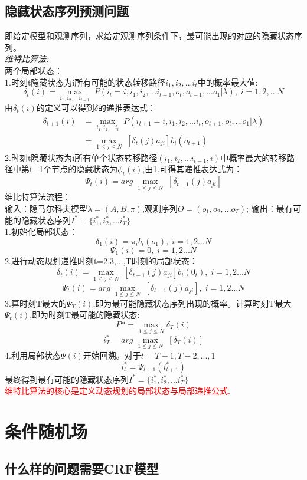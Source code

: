 \documentclass[UTF8]{article}%
\begin{document}
	\subsection{隐藏状态序列预测问题}
	即给定模型和观测序列，求给定观测序列条件下，最可能出现的对应的隐藏状态序列。\\
	\emph{\large 维特比算法:}\\
	两个局部状态：\\
	1.时刻t隐藏状态为i所有可能的状态转移路径$i_1,i_2,...i_t$中的概率最大值:
	$$\delta_t(i) = \max_{i_1,i_2,...i_{t-1}}\;P(i_t=i, i_1,i_2,...i_{t-1},o_t,o_{t-1},...o_1|\lambda),\; i =1,2,...N$$
	由$\delta_t(i)$的定义可以得到$\delta$的递推表达式：
	\begin{align} 
		 \delta_{t+1}(i)
		  & =  \max_{i_1,i_2,...i_{t}} \; P(i_{t+1}=i,i_1,i_2,...i_{t},o_{t+1},o_{t},...o_1|\lambda)
		  \\ & = \max_{1 \leq j \leq N}\;[\delta_t(j)a_{ji}]b_i(o_{t+1})
	\end{align}
	2.时刻t隐藏状态为i所有单个状态转移路径$(i_1,i_2,...i_{t-1},i)$中概率最大的转移路径中第t−1个节点的隐藏状态为$\phi_t(i)$,由1.可得其递推表达式为：
	$$\Psi_t(i) = arg \; \max_{1 \leq j \leq N}\;[\delta_{t-1}(j)a_{ji}]$$
	维比特算法流程：\\
	输入：隐马尔科夫模型$\lambda = (A,B,\pi)$,观测序列$O=(o_1,o_2,...o_T)$;
	输出：最有可能的隐藏状态序列$I^*= \{i_1^*,i_2^*,...i_T^*\}$\\
	1.初始化局部状态：
	$$\delta_1(i) = \pi_ib_i(o_1),\;i=1,2...N$$
	$$\Psi_1(i)=0,\;i=1,2...N$$
	2.进行动态规划递推时刻t=2,3,...,T时刻的局部状态：
	$$\delta_{t}(i) = \max_{1 \leq j \leq N}\;[\delta_{t-1}(j)a_{ji}]b_i(0_{t}),\;i=1,2...N$$
	$$\Psi_t(i) = arg \; \max_{1 \leq j \leq N}\;[\delta_{t-1}(j)a_{ji}],\;i=1,2...N$$
	3.算时刻T最大的$\Psi_T(i)$,即为最可能隐藏状态序列出现的概率。计算时刻T最大$\Psi_t(i)$,即为时刻T最可能的隐藏状态:
	$$P* = \max_{1 \leq j \leq N}\delta_{T}(i)$$
	$$i_T^* = arg \; \max_{1 \leq j \leq N}\;[\delta_{T}(i)]$$
	4.利用局部状态$\Psi(i) $开始回溯。对于$t=T-1,T-2,...,1$
	$$i_t^* = \Psi_{t+1}(i_{t+1}^*)$$
	最终得到最有可能的隐藏状态序列$I^*= \{i_1^*,i_2^*,...i_T^*\}$\\
	\textcolor{red}{维特比算法的核心是定义动态规划的局部状态与局部递推公式.}
	
	\newpage
	\section{条件随机场}
	\subsection{什么样的问题需要CRF模型}
\end{document}
